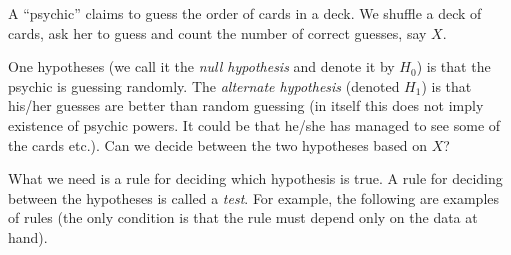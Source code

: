 \documentclass[preprint,  11pt]{amsart}
\begin{document}


\begin{question} A ``psychic'' claims to guess the order of cards in a deck. We shuffle a deck of cards, ask her to guess and count the number of correct guesses, say $X$.

\medskip
One hypotheses (we call it the {\em null hypothesis} and denote it by $H_{0}$) is that the psychic is guessing randomly. The {\em alternate hypothesis} (denoted $H_{1}$) is that his/her guesses are better than random guessing (in itself this does not imply existence of psychic powers. It could be that he/she has managed to see some of the cards etc.). Can we decide between the two hypotheses based on $X$?
\end{question}

What we need is a rule for deciding which hypothesis is true. A rule for deciding between the hypotheses is called a {\em test}. For example, the following are examples of rules (the only condition is that the rule must depend only on the data at hand).
\end{document}
